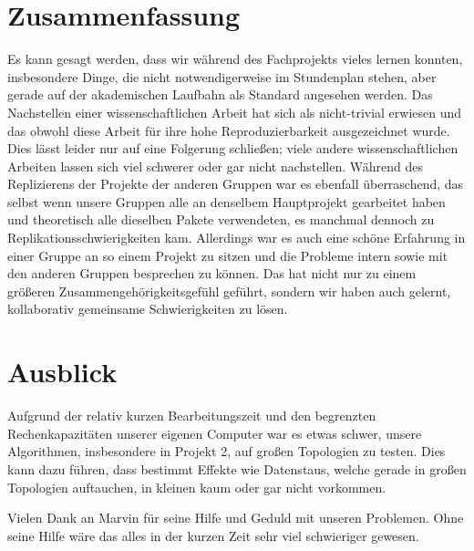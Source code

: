 \documentclass[sigconf, nonacm, review]{acmart}
\begin{document}
\section{Zusammenfassung}
Es kann gesagt werden, dass wir w\"ahrend des Fachprojekts vieles lernen konnten, 
insbesondere Dinge, die nicht notwendigerweise im Stundenplan stehen, 
aber gerade auf der akademischen Laufbahn als Standard angesehen werden.
Das Nachstellen einer wissenschaftlichen Arbeit hat sich als nicht-trivial erwiesen 
und das obwohl diese Arbeit f\"ur ihre hohe Reproduzierbarkeit ausgezeichnet wurde.
Dies l\"asst leider nur auf eine Folgerung schlie\ss en; viele andere wissenschaftlichen Arbeiten lassen sich viel schwerer oder gar nicht nachstellen. 
W\"ahrend des Replizierens der Projekte der anderen Gruppen war es ebenfall \"uberraschend, 
das selbst wenn unsere Gruppen alle an denselbem Hauptprojekt gearbeitet haben 
und theoretisch alle dieselben Pakete verwendeten, 
es manchmal dennoch zu Replikationsschwierigkeiten kam.
Allerdings war es auch eine sch\"one Erfahrung in einer Gruppe an so einem Projekt zu sitzen 
und die Probleme intern sowie mit den anderen Gruppen besprechen zu k\"onnen.
Das hat nicht nur zu einem gr\"o\ss eren Zusammengeh\"origkeitsgef\"uhl gef\"uhrt,
sondern wir haben auch gelernt, kollaborativ gemeinsame Schwierigkeiten zu l\"osen. 
\section{Ausblick}
Aufgrund der relativ kurzen Bearbeitungszeit und den begrenzten Rechenkapazit\"aten unserer eigenen Computer war es etwas schwer, unsere Algorithmen, insbesondere in Projekt 2, auf gro\ss en Topologien zu testen.
Dies kann dazu f\"uhren, dass bestimmt Effekte wie Datenstaus, welche gerade in gro\ss en Topologien auftauchen, in kleinen kaum oder gar nicht vorkommen.

\begin{acks}
Vielen Dank an Marvin f\"ur seine Hilfe und Geduld mit unseren Problemen. Ohne seine Hilfe w\"are das alles in der kurzen Zeit sehr viel schwieriger gewesen.
\end{acks}




\appendix
\pagebreak
\end{document}

